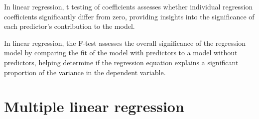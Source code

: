\documentclass[
  a4paper,
]{scrbook}
\begin{document}
In linear regression, t testing of coefficients assesses whether
individual regression coefficients significantly differ from zero,
providing insights into the significance of each predictor's
contribution to the model.

\begin{table}

\caption{\label{tbl-lm-f-test}The significance of the model.}


\end{table}%

In linear regression, the F-test assesses the overall significance of
the regression model by comparing the fit of the model with predictors
to a model without predictors, helping determine if the regression
equation explains a significant proportion of the variance in the
dependent variable.

\section{Multiple linear regression}\label{multiple-linear-regression}
\end{document}
